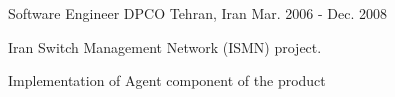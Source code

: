 \begin{cventries}
  \cventry
    {Software Engineer} %
    {DPCO} %
    {Tehran, Iran} %
    {Mar. 2006 - Dec. 2008} %
    {
      \begin{cvitems} %
        \item {Iran Switch Management Network (ISMN) project.}
        \item {Implementation of Agent component of the product}
      \end{cvitems}
    }

\end{cventries}
